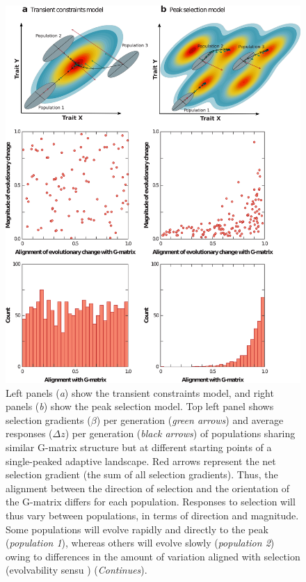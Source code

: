 \begin{refsection}
\begin{figure}[ht]
\includegraphics[width=\linewidth]{chapter_annual_review/media/figure3.png}
\caption[Evolution and covariation]{Left panels (\emph{a}) show the transient constraints model, and right panels (\emph{b}) show the peak selection model. 
Top left panel shows selection gradients ($\beta$) per generation (\emph{green arrows}) and average responses ($\Delta z$) per generation (\emph{black arrows}) of populations sharing similar G-matrix structure but at different starting points of a single-peaked adaptive landscape. 
Red arrows represent the net selection gradient (the sum of all selection gradients). 
Thus, the alignment between the direction of selection and the orientation of the G-matrix differs for each population. 
Responses to selection will thus vary between populations, in terms of direction and magnitude. 
Some populations will evolve rapidly and directly to the peak (\emph{population 1}), whereas others will evolve slowly (\emph{population 2}) owing to differences in the amount of variation aligned with selection (evolvability sensu \textcite{Hansen2008-kz}) (\emph{Continues}). 
}
\end{figure}
\end{refsection}

